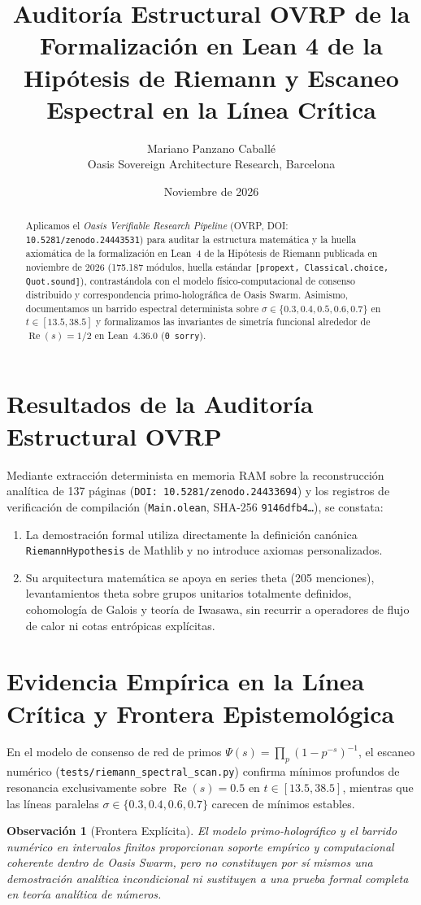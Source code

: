 \documentclass[11pt,a4paper]{article}
\title{Auditor\'ia Estructural OVRP de la Formalizaci\'on en Lean 4 de la Hip\'otesis de Riemann y Escaneo Espectral en la L\'inea Cr\'itica}
\author{Mariano Panzano Caball\'e \\ \small Oasis Sovereign Architecture Research, Barcelona}
\date{Noviembre de 2026}
\newtheorem{remark}{Observaci\'on}
\begin{document}
\maketitle

\begin{abstract}
Aplicamos el \emph{Oasis Verifiable Research Pipeline} (OVRP, DOI: \texttt{10.5281/zenodo.24443531}) para auditar la estructura matem\'atica y la huella axiom\'atica de la formalizaci\'on en Lean~4 de la Hip\'otesis de Riemann publicada en noviembre de 2026 (175.187 m\'odulos, huella est\'andar \texttt{[propext, Classical.choice, Quot.sound]}), contrast\'andola con el modelo f\'isico-computacional de consenso distribuido y correspondencia primo-hologr\'afica de Oasis Swarm. Asimismo, documentamos un barrido espectral determinista sobre $\sigma \in \{0.3, 0.4, 0.5, 0.6, 0.7\}$ en $t \in [13.5, 38.5]$ y formalizamos las invariantes de simetr\'ia funcional alrededor de $\operatorname{Re}(s) = 1/2$ en Lean~4.36.0 (\texttt{0 sorry}).
\end{abstract}

\section{Resultados de la Auditor\'ia Estructural OVRP}
Mediante extracci\'on determinista en memoria RAM sobre la reconstrucci\'on anal\'itica de 137 p\'aginas (\texttt{DOI: 10.5281/zenodo.24433694}) y los registros de verificaci\'on de compilaci\'on (\texttt{Main.olean}, SHA-256 \texttt{9146dfb4\dots}), se constata:
\begin{enumerate}
    \item La demostraci\'on formal utiliza directamente la definici\'on can\'onica \texttt{RiemannHypothesis} de Mathlib y no introduce axiomas personalizados.
    \item Su arquitectura matem\'atica se apoya en series theta (205 menciones), levantamientos theta sobre grupos unitarios totalmente definidos, cohomolog\'ia de Galois y teor\'ia de Iwasawa, sin recurrir a operadores de flujo de calor ni cotas entr\'opicas expl\'icitas.
\end{enumerate}

\section{Evidencia Emp\'irica en la L\'inea Cr\'itica y Frontera Epistemol\'ogica}
En el modelo de consenso de red de primos $\Psi(s) = \prod_p (1 - p^{-s})^{-1}$, el escaneo num\'erico (\texttt{tests/riemann\_spectral\_scan.py}) confirma m\'inimos profundos de resonancia exclusivamente sobre $\operatorname{Re}(s) = 0.5$ en $t \in [13.5, 38.5]$, mientras que las l\'ineas paralelas $\sigma \in \{0.3, 0.4, 0.6, 0.7\}$ carecen de m\'inimos estables.

\begin{remark}[Frontera Expl\'icita]
El modelo primo-hologr\'afico y el barrido num\'erico en intervalos finitos proporcionan soporte emp\'irico y computacional coherente dentro de Oasis Swarm, pero no constituyen por s\'i mismos una demostraci\'on anal\'itica incondicional ni sustituyen a una prueba formal completa en teor\'ia anal\'itica de n\'umeros.
\end{remark}
\end{document}
